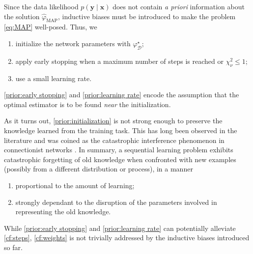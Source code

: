Since the data likelihood $p(\mathbf{y} \mid \mathbf{x})$ 
does not contain \textit{a priori} information 
about the solution $\hat{\varphi}_{\mathrm{MAP}}$,
inductive biases must be introduced to make 
the problem \eqref{eq:MAP} well-posed. Thus, we
\begin{enumerate}[label=(\subscript{\mathcal{H}}{{\arabic*}})]
        \item \label{prior:initialization} initialize the network parameters with $\varphi_{\mathcal{D}}^{\star}$; 
        \item \label{prior:early stopping} apply early stopping when a maximum number of steps is reached or 
                $\chi^2_\nu \leq 1$;
        \item \label{prior:learning rate} use a small learning rate.
\end{enumerate}
\ref{prior:early stopping} and \ref{prior:learning rate} encode the assumption 
that the optimal estimator is to be found \textit{near} the initialization.

As it turns out, \ref{prior:initialization} is not strong 
enough to preserve the knowledge learned from the training task. 
This has long been observed in the literature and was coined as the 
catastrophic interference phenomenon in 
connectionist networks \citep{McCloskey1989,Ratcliff1990}.
In summary, a sequential learning problem exhibits catastrophic 
forgetting of old knowledge when confronted with new examples (possibly 
from a different distribution or process), in a manner 
\begin{enumerate}[label=(\subscript{\mathrm{CF}}{{\arabic*}})]
        \item \label{cf:steps} proportional to the amount of learning;
        \item \label{cf:weights} strongly dependant to the disruption of the parameters
                involved in representing the old knowledge.
\end{enumerate}
While \ref{prior:early stopping} and \ref{prior:learning rate} can 
potentially alleviate \ref{cf:steps}, \ref{cf:weights} is not 
trivially addressed by the inductive biases introduced so far.

